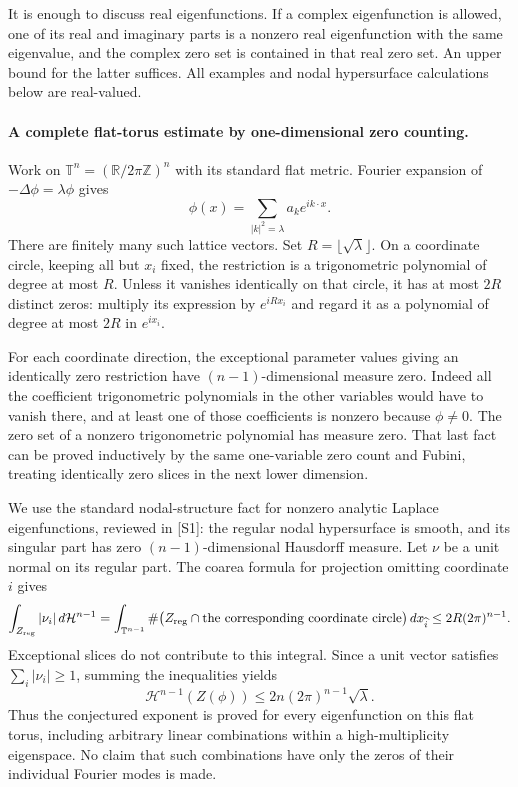 \documentclass[11pt]{article}
\begin{document}
It is enough to discuss real eigenfunctions. If a complex eigenfunction
is allowed, one of its real and imaginary parts is a nonzero real
eigenfunction with the same eigenvalue, and the complex zero set is
contained in that real zero set. An upper bound for the latter suffices.
All examples and nodal hypersurface calculations below are real-valued.

\paragraph{A complete flat-torus estimate by one-dimensional zero counting.}
Work on $\mathbb T^n=(\mathbb R/2\pi\mathbb Z)^n$ with its standard
flat metric. Fourier expansion of $-\Delta\phi=\lambda\phi$ gives
\[
                 \phi(x)=\sum_{|k|^2=\lambda}a_ke^{ik\cdot x}.
\]
There are finitely many such lattice vectors. Set
$R=\lfloor\sqrt\lambda\rfloor$. On a coordinate circle, keeping
all but $x_i$ fixed, the restriction is a trigonometric polynomial
of degree at most $R$. Unless it vanishes identically on that circle,
it has at most $2R$ distinct zeros: multiply its expression by
$e^{iRx_i}$ and regard it as a polynomial of degree at most $2R$
in $e^{ix_i}$.

For each coordinate direction, the exceptional parameter values giving
an identically zero restriction have $(n-1)$-dimensional measure zero.
Indeed all the coefficient trigonometric polynomials in the other
variables would have to vanish there, and at least one of those
coefficients is nonzero because $\phi\ne0$. The zero set of a
nonzero trigonometric polynomial has measure zero. That last fact can
be proved inductively by the same one-variable zero count and Fubini,
treating identically zero slices in the next lower dimension.

We use the standard nodal-structure fact for nonzero analytic Laplace
eigenfunctions, reviewed in [S1]: the regular nodal hypersurface is
smooth, and its singular part has zero $(n-1)$-dimensional Hausdorff
measure. Let $\nu$ be a unit normal on its regular part. The coarea
formula for projection omitting coordinate $i$ gives
\[
 \int_{Z_{\rm reg}}|\nu_i|\,d\mathcal H^{n-1}
   =\int_{\mathbb T^{n-1}}\#\bigl(Z_{\rm reg}\cap
                  \text{the corresponding coordinate circle}\bigr)
                        \,dx_{\widehat i}
   \le2R(2\pi)^{n-1}.
\]
Exceptional slices do not contribute to this integral. Since a unit
vector satisfies $\sum_i|\nu_i|\ge1$, summing the inequalities yields
\begin{equation}\label{a277:torus}
 \mathcal H^{n-1}(Z(\phi))
                 \le2n(2\pi)^{n-1}\sqrt\lambda.
\end{equation}
Thus the conjectured exponent is proved for every eigenfunction on
this flat torus, including arbitrary linear combinations within a
high-multiplicity eigenspace. No claim that such combinations have
only the zeros of their individual Fourier modes is made.
\end{document}
